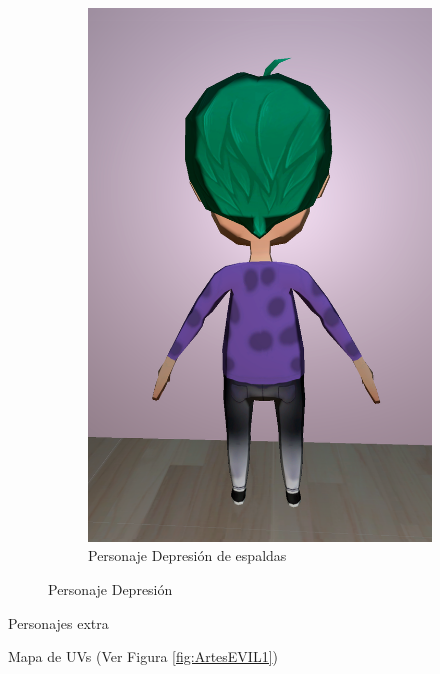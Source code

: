 \documentclass[12pt, a4paper,twoside,titlepage]{book}
\begin{document}
\begin{figure}
\begin{subfigure}{.5\textwidth}
  \includegraphics[width=.95\linewidth]{TGF/Artes/DEP_back.png}
  \caption{Personaje Depresión de espaldas}
\end{subfigure}
\caption{Personaje Depresión}
\label{fig:ArtesDEP2}
\end{figure}


Personajes extra
 
 Mapa de UVs (Ver Figura \ref{fig:ArtesEVIL1})
 
\end{document}
